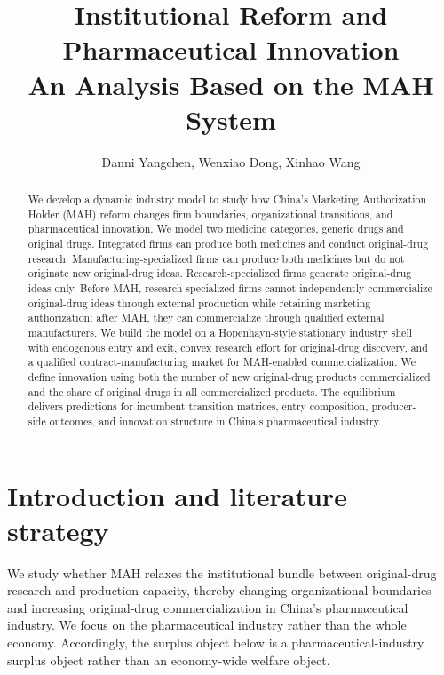 \documentclass[12pt]{article}
\title{Institutional Reform and Pharmaceutical Innovation\\
An Analysis Based on the MAH System}
\author{Danni Yangchen, Wenxiao Dong, Xinhao Wang}
\date{}
\newcommand{\1}{\mathbf{1}}
\begin{document}
\maketitle

\begin{abstract}
We develop a dynamic industry model to study how China's Marketing Authorization Holder (MAH) reform changes firm boundaries, organizational transitions, and pharmaceutical innovation. We model two medicine categories, generic drugs and original drugs. Integrated firms can produce both medicines and conduct original-drug research. Manufacturing-specialized firms can produce both medicines but do not originate new original-drug ideas. Research-specialized firms generate original-drug ideas only. Before MAH, research-specialized firms cannot independently commercialize original-drug ideas through external production while retaining marketing authorization; after MAH, they can commercialize through qualified external manufacturers. We build the model on a Hopenhayn-style stationary industry shell with endogenous entry and exit, convex research effort for original-drug discovery, and a qualified contract-manufacturing market for MAH-enabled commercialization. We define innovation using both the number of new original-drug products commercialized and the share of original drugs in all commercialized products. The equilibrium delivers predictions for incumbent transition matrices, entry composition, producer-side outcomes, and innovation structure in China's pharmaceutical industry.
\end{abstract}

\section{Introduction and literature strategy}

We study whether MAH relaxes the institutional bundle between original-drug research and production capacity, thereby changing organizational boundaries and increasing original-drug commercialization in China's pharmaceutical industry. We focus on the pharmaceutical industry rather than the whole economy. Accordingly, the surplus object below is a pharmaceutical-industry surplus object rather than an economy-wide welfare object.
\end{document}
